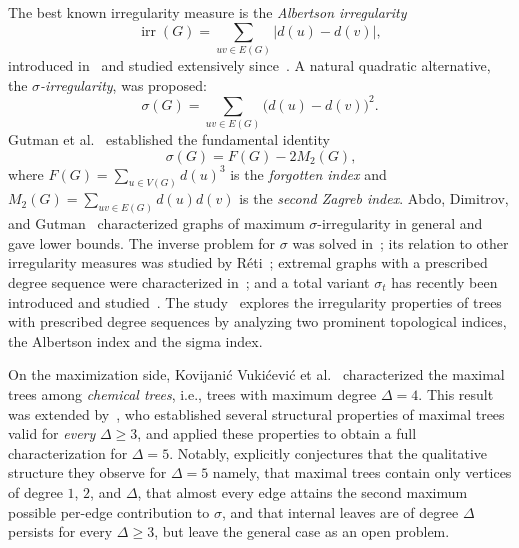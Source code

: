 \documentclass[12pt]{amsart}
\begin{document}
The best known irregularity measure is the \emph{Albertson irregularity}
\begin{equation}
\operatorname{irr}(G) = \sum_{uv\in E(G)} \big|d(u)-d(v)\big|,
\label{eq:albertson}
\end{equation}
introduced in~\cite{Albertson1997} and studied extensively
since~\cite{AbdoEtAl2014a,AbdoEtAl2014b,GutmanEtAl2005,HansenMelot2005}. A natural
quadratic alternative, the \emph{$\sigma$-irregularity}, was proposed:
\begin{equation}
\sigma(G) = \sum_{uv\in E(G)} \big(d(u)-d(v)\big)^2.
\label{eq:sigma-def}
\end{equation}
Gutman et al.~\cite{GutmanEtAl2018} established the fundamental identity
\begin{equation}~\label{eqq01forgottsigmadecomp}
\sigma(G) = F(G) - 2M_2(G),
\end{equation}
where $F(G)=\sum_{u\in V(G)} d(u)^3$ is the \emph{forgotten index} and $M_2(G)=\sum_{uv\in E(G)} d(u)d(v)$ is the \emph{second Zagreb index}. 
Abdo, Dimitrov, and Gutman~\cite{AbdoEtAl2018} characterized graphs of maximum $\sigma$-irregularity in general and gave lower bounds. The inverse problem for
$\sigma$ was solved in~\cite{AbdoEtAl2018,GutmanEtAl2018}; its relation to other irregularity measures was studied by R\'eti~\cite{Reti2019}; extremal graphs
with a prescribed degree sequence were characterized in~\cite{DimitrovEtAl2023};
and a total variant $\sigma_t$ has recently been introduced and
studied~\cite{FilipovskiEtAl2024,KnorEtAl2025}. 
The study~\cite{Hamoud2026N1} explores the irregularity properties of trees with prescribed degree sequences by analyzing two prominent topological indices, the Albertson index and the sigma index.

On the maximization side, Kovijani\'c Vuki\'cevi\'c et
al.~\cite{VukicevicEtAl2024} characterized the maximal trees among
\emph{chemical trees}, i.e., trees with maximum degree $\Delta=4$. This result
was extended by~\cite{DimitrovPaper2025}, who established
several structural properties of maximal trees valid for \emph{every}
$\Delta\ge 3$, and applied these properties to obtain a full characterization
for $\Delta=5$. Notably, \cite{DimitrovPaper2025} explicitly conjectures that the
qualitative structure they observe for $\Delta=5$ namely, that maximal trees contain only vertices of degree $1$, $2$, and $\Delta$, that almost every edge attains the second maximum possible per-edge contribution to $\sigma$,
and that internal leaves are of degree $\Delta$ persists for every
$\Delta\ge 3$, but leave the general case as an open problem.
\end{document}
